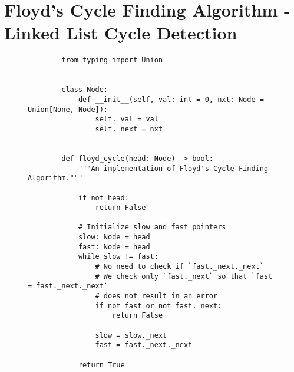 
\section{Floyd's Cycle Finding Algorithm - Linked List Cycle Detection}

\begin{figure}[H]
    \centering
    \begin{verbatim}
        from typing import Union


        class Node:
            def __init__(self, val: int = 0, nxt: Node = Union[None, Node]):
                self._val = val
                self._next = nxt


        def floyd_cycle(head: Node) -> bool:
            """An implementation of Floyd's Cycle Finding Algorithm."""

            if not head:
                return False

            # Initialize slow and fast pointers
            slow: Node = head
            fast: Node = head
            while slow != fast:
                # No need to check if `fast._next._next`
                # We check only `fast._next` so that `fast = fast._next._next`
                # does not result in an error
                if not fast or not fast._next:
                    return False

                slow = slow._next
                fast = fast._next._next

            return True
    \end{verbatim}
\end{figure}
